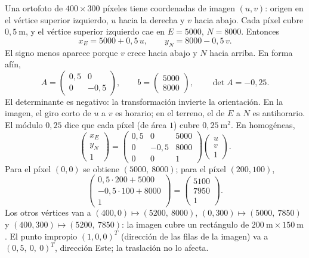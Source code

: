 \begin{ejemplo}\label{ej:06-dron}
Una ortofoto de \(400\times300\) píxeles tiene coordenadas de imagen \((u,v)\): origen en el
vértice superior izquierdo, \(u\) hacia la derecha y \(v\) hacia abajo. Cada píxel cubre
\(0{,}5\ \mathrm{m}\), y el vértice superior izquierdo cae en \(E=5000\), \(N=8000\). Entonces
\[
  x_E=5000+0{,}5\,u,\qquad y_N=8000-0{,}5\,v .
\]
El signo menos aparece porque \(v\) crece hacia abajo y \(N\) hacia arriba. En forma afín,
\[
  A=\begin{pmatrix}0{,}5&0\\0&-0{,}5\end{pmatrix},
  \qquad b=\begin{pmatrix}5000\\8000\end{pmatrix},
  \qquad \det A=-0{,}25 .
\]
El determinante es negativo: la transformación invierte la orientación. En la imagen, el
giro corto de \(u\) a \(v\) es horario; en el terreno, el de \(E\) a \(N\) es antihorario.
El módulo \(0{,}25\) dice que cada píxel (de área \(1\)) cubre \(0{,}25\ \mathrm{m}^2\).
En homogéneas,
\[
  \begin{pmatrix}x_E\\y_N\\1\end{pmatrix}
  =
  \begin{pmatrix}0{,}5&0&5000\\0&-0{,}5&8000\\0&0&1\end{pmatrix}
  \begin{pmatrix}u\\v\\1\end{pmatrix}.
\]
Para el píxel \((0,0)\) se obtiene \((5000,\ 8000)\); para el píxel \((200,100)\),
\[
  \begin{pmatrix}0{,}5\cdot200+5000\\-0{,}5\cdot100+8000\\1\end{pmatrix}
  =\begin{pmatrix}5100\\7950\\1\end{pmatrix}.
\]
Los otros vértices van a \((400,0)\mapsto(5200,\ 8000)\), \((0,300)\mapsto(5000,\ 7850)\) y
\((400,300)\mapsto(5200,\ 7850)\): la imagen cubre un rectángulo de
\(200\ \mathrm{m}\times150\ \mathrm{m}\). El punto impropio \((1,0,0)^T\) (dirección de las
filas de la imagen) va a \((0{,}5,\ 0,\ 0)^T\), dirección Este; la traslación no lo afecta.
\end{ejemplo}

